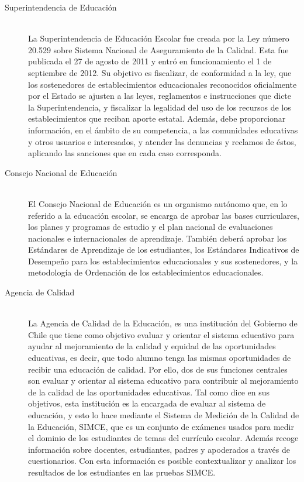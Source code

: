 \begin{description}
\item[Superintendencia de Educación] \hfill \\
La Superintendencia de Educación Escolar fue creada por la Ley número 20.529 sobre Sistema Nacional de Aseguramiento de la Calidad. Esta fue publicada el 27 de agosto de 2011 y entró en funcionamiento el 1 de septiembre de 2012. 
Su objetivo es fiscalizar, de conformidad a la ley, que los sostenedores de establecimientos educacionales reconocidos oficialmente por el Estado se ajusten a las leyes, reglamentos e instrucciones que dicte la Superintendencia, y fiscalizar la legalidad del uso de los recursos de los establecimientos que reciban aporte estatal. Además, debe proporcionar información, en el ámbito de su competencia, a las comunidades educativas y otros usuarios e interesados, y atender las denuncias y reclamos de éstos, aplicando las sanciones que en cada caso corresponda. \cite{superint}
\item[Consejo Nacional de Educación] \hfill \\
El Consejo Nacional de Educación es un organismo autónomo que, en lo referido a la educación escolar, se encarga de aprobar las bases curriculares, los planes y programas de estudio y el plan nacional de evaluaciones nacionales e internacionales de aprendizaje. También deberá aprobar los Estándares de Aprendizaje de los estudiantes, los Estándares Indicativos de Desempeño para los establecimientos educacionales y sus sostenedores, y la metodología de Ordenación de los establecimientos educacionales.
\item[Agencia de Calidad] \hfill \\
La Agencia de Calidad de la Educación, es una institución del Gobierno de Chile que tiene como objetivo  evaluar y orientar el sistema educativo para ayudar al mejoramiento de la calidad y equidad de las oportunidades educativas, es decir, que todo alumno tenga las mismas oportunidades de recibir una educación de calidad. Por ello, dos de sus funciones centrales son evaluar y orientar al sistema educativo para contribuir al mejoramiento de la calidad de las oportunidades educativas. \cite{agenciacalidad}
Tal como dice en sus objetivos, esta institución es la encargada de evaluar al sistema de educación, y esto lo hace mediante el Sistema de Medición de la Calidad de la Educación, SIMCE, que es un conjunto de exámenes usados para medir el dominio de los estudiantes de temas del currículo escolar. Además recoge información sobre docentes, estudiantes, padres y apoderados a través de cuestionarios. Con esta información es posible contextualizar y analizar los resultados de los estudiantes en las pruebas SIMCE. 
\end{description}

